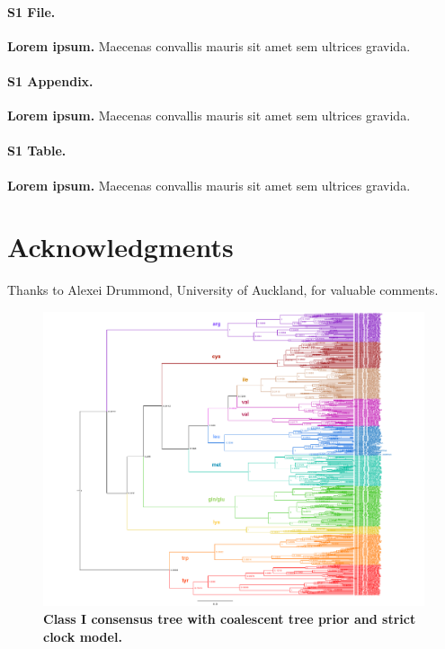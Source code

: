 \documentclass[10pt,letterpaper]{article}
\begin{document}
\paragraph*{S1 File.}
\label{S1_File}
{\bf Lorem ipsum.}  Maecenas convallis mauris sit amet sem ultrices gravida. 

\paragraph*{S1 Appendix.}
\label{S1_Appendix}
{\bf Lorem ipsum.} Maecenas convallis mauris sit amet sem ultrices gravida. 

\paragraph*{S1 Table.}
\label{S1_Table}
{\bf Lorem ipsum.} Maecenas convallis mauris sit amet sem ultrices gravida. 

\section*{Acknowledgments}
Thanks to Alexei Drummond, University of Auckland, for valuable comments.

\nolinenumbers

%
%
\begin{figure}
  \caption{\bf Class I consensus tree with coalescent tree prior and strict clock model.}
  \centering
    \includegraphics[width=\textwidth]{ClassI_Coalescent_1}
\end{figure}
\end{document}
